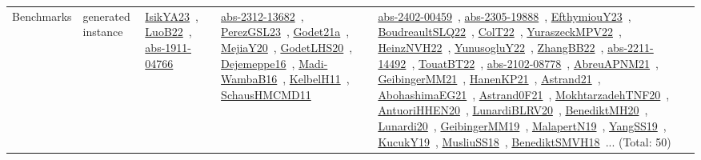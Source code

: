 {\begin{longtable}{lp{3cm}>{\raggedright\arraybackslash}p{6cm}>{\raggedright\arraybackslash}p{6cm}>{\raggedright\arraybackslash}p{8cm}}
Benchmarks & generated instance & \href{works/IsikYA23.pdf}{IsikYA23}~\cite{IsikYA23}, \href{works/LuoB22.pdf}{LuoB22}~\cite{LuoB22}, \href{works/abs-1911-04766.pdf}{abs-1911-04766}~\cite{abs-1911-04766} & \href{works/abs-2312-13682.pdf}{abs-2312-13682}~\cite{abs-2312-13682}, \href{works/PerezGSL23.pdf}{PerezGSL23}~\cite{PerezGSL23}, \href{works/Godet21a.pdf}{Godet21a}~\cite{Godet21a}, \href{works/MejiaY20.pdf}{MejiaY20}~\cite{MejiaY20}, \href{works/GodetLHS20.pdf}{GodetLHS20}~\cite{GodetLHS20}, \href{works/Dejemeppe16.pdf}{Dejemeppe16}~\cite{Dejemeppe16}, \href{works/Madi-WambaB16.pdf}{Madi-WambaB16}~\cite{Madi-WambaB16}, \href{works/KelbelH11.pdf}{KelbelH11}~\cite{KelbelH11}, \href{works/SchausHMCMD11.pdf}{SchausHMCMD11}~\cite{SchausHMCMD11} & \href{works/abs-2402-00459.pdf}{abs-2402-00459}~\cite{abs-2402-00459}, \href{works/abs-2305-19888.pdf}{abs-2305-19888}~\cite{abs-2305-19888}, \href{works/EfthymiouY23.pdf}{EfthymiouY23}~\cite{EfthymiouY23}, \href{works/BoudreaultSLQ22.pdf}{BoudreaultSLQ22}~\cite{BoudreaultSLQ22}, \href{works/ColT22.pdf}{ColT22}~\cite{ColT22}, \href{works/YuraszeckMPV22.pdf}{YuraszeckMPV22}~\cite{YuraszeckMPV22}, \href{works/HeinzNVH22.pdf}{HeinzNVH22}~\cite{HeinzNVH22}, \href{works/YunusogluY22.pdf}{YunusogluY22}~\cite{YunusogluY22}, \href{works/ZhangBB22.pdf}{ZhangBB22}~\cite{ZhangBB22}, \href{works/abs-2211-14492.pdf}{abs-2211-14492}~\cite{abs-2211-14492}, \href{works/TouatBT22.pdf}{TouatBT22}~\cite{TouatBT22}, \href{works/abs-2102-08778.pdf}{abs-2102-08778}~\cite{abs-2102-08778}, \href{works/AbreuAPNM21.pdf}{AbreuAPNM21}~\cite{AbreuAPNM21}, \href{works/GeibingerMM21.pdf}{GeibingerMM21}~\cite{GeibingerMM21}, \href{works/HanenKP21.pdf}{HanenKP21}~\cite{HanenKP21}, \href{works/Astrand21.pdf}{Astrand21}~\cite{Astrand21}, \href{works/AbohashimaEG21.pdf}{AbohashimaEG21}~\cite{AbohashimaEG21}, \href{works/Astrand0F21.pdf}{Astrand0F21}~\cite{Astrand0F21}, \href{works/MokhtarzadehTNF20.pdf}{MokhtarzadehTNF20}~\cite{MokhtarzadehTNF20}, \href{works/AntuoriHHEN20.pdf}{AntuoriHHEN20}~\cite{AntuoriHHEN20}, \href{works/LunardiBLRV20.pdf}{LunardiBLRV20}~\cite{LunardiBLRV20}, \href{works/BenediktMH20.pdf}{BenediktMH20}~\cite{BenediktMH20}, \href{works/Lunardi20.pdf}{Lunardi20}~\cite{Lunardi20}, \href{works/GeibingerMM19.pdf}{GeibingerMM19}~\cite{GeibingerMM19}, \href{works/MalapertN19.pdf}{MalapertN19}~\cite{MalapertN19}, \href{works/YangSS19.pdf}{YangSS19}~\cite{YangSS19}, \href{works/KucukY19.pdf}{KucukY19}~\cite{KucukY19}, \href{works/MusliuSS18.pdf}{MusliuSS18}~\cite{MusliuSS18}, \href{works/BenediktSMVH18.pdf}{BenediktSMVH18}~\cite{BenediktSMVH18}... (Total: 50)\\

\end{longtable}}
